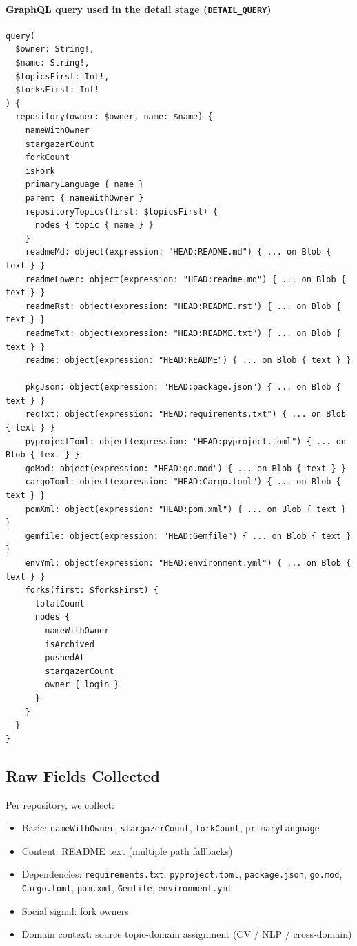 \documentclass[11pt]{article}
\begin{document}
\paragraph{GraphQL query used in the detail stage (\texttt{DETAIL\_QUERY})}
\begin{verbatim}
query(
  $owner: String!,
  $name: String!,
  $topicsFirst: Int!,
  $forksFirst: Int!
) {
  repository(owner: $owner, name: $name) {
    nameWithOwner
    stargazerCount
    forkCount
    isFork
    primaryLanguage { name }
    parent { nameWithOwner }
    repositoryTopics(first: $topicsFirst) {
      nodes { topic { name } }
    }
    readmeMd: object(expression: "HEAD:README.md") { ... on Blob { text } }
    readmeLower: object(expression: "HEAD:readme.md") { ... on Blob { text } }
    readmeRst: object(expression: "HEAD:README.rst") { ... on Blob { text } }
    readmeTxt: object(expression: "HEAD:README.txt") { ... on Blob { text } }
    readme: object(expression: "HEAD:README") { ... on Blob { text } }

    pkgJson: object(expression: "HEAD:package.json") { ... on Blob { text } }
    reqTxt: object(expression: "HEAD:requirements.txt") { ... on Blob { text } }
    pyprojectToml: object(expression: "HEAD:pyproject.toml") { ... on Blob { text } }
    goMod: object(expression: "HEAD:go.mod") { ... on Blob { text } }
    cargoToml: object(expression: "HEAD:Cargo.toml") { ... on Blob { text } }
    pomXml: object(expression: "HEAD:pom.xml") { ... on Blob { text } }
    gemfile: object(expression: "HEAD:Gemfile") { ... on Blob { text } }
    envYml: object(expression: "HEAD:environment.yml") { ... on Blob { text } }
    forks(first: $forksFirst) {
      totalCount
      nodes {
        nameWithOwner
        isArchived
        pushedAt
        stargazerCount
        owner { login }
      }
    }
  }
}
\end{verbatim}

\subsection{Raw Fields Collected}
Per repository, we collect:
\begin{itemize}[leftmargin=1.5em]
    \item Basic: \texttt{nameWithOwner}, \texttt{stargazerCount}, \texttt{forkCount}, \texttt{primaryLanguage}
    \item Content: README text (multiple path fallbacks)
    \item Dependencies: \texttt{requirements.txt}, \texttt{pyproject.toml}, \texttt{package.json}, \texttt{go.mod}, \texttt{Cargo.toml}, \texttt{pom.xml}, \texttt{Gemfile}, \texttt{environment.yml}
    \item Social signal: fork owners
    \item Domain context: source topic-domain assignment (CV / NLP / cross-domain)
\end{itemize}
\end{document}
